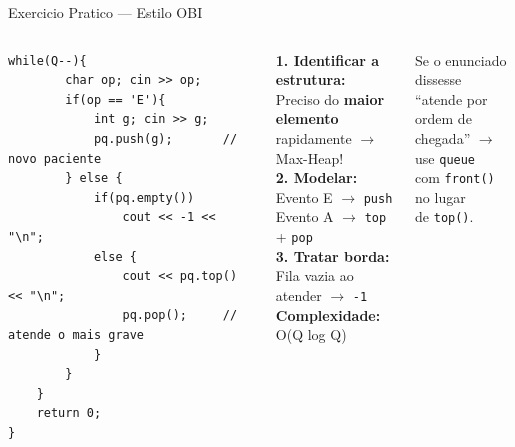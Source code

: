 \documentclass[aspectratio=169,11pt]{beamer}
\begin{document}
\begin{frame}[fragile,shrink=5]{Exercicio Pratico --- Estilo OBI}
\begin{columns}[t]
\begin{tcolorbox}[caixaCodigo]
\begin{lstlisting}[style=cppsmall]
    while(Q--){
        char op; cin >> op;
        if(op == 'E'){
            int g; cin >> g;
            pq.push(g);       // novo paciente
        } else {
            if(pq.empty())
                cout << -1 << "\n";
            else {
                cout << pq.top() << "\n";
                pq.pop();     // atende o mais grave
            }
        }
    }
    return 0;
}
        \end{lstlisting}
      \end{tcolorbox}
      \begin{tcolorbox}[caixaAmarelo,title={Estrategia de solucao}]
        \footnotesize
        \textbf{1. Identificar a estrutura:}\\
        Preciso do \textbf{maior elemento}\\
        rapidamente $\to$ Max-Heap!\\[5pt]
        \textbf{2. Modelar:}\\
        Evento E $\to$ \texttt{push}\\
        Evento A $\to$ \texttt{top} + \texttt{pop}\\[5pt]
        \textbf{3. Tratar borda:}\\
        Fila vazia ao atender $\to$ \texttt{-1}\\[5pt]
        \textbf{Complexidade:}\\
        O(Q log Q)
      \end{tcolorbox}
      \vspace{0.15cm}
      \begin{tcolorbox}[caixaVerde,title={Variacao: fila normal}]
        \footnotesize
        Se o enunciado dissesse\\
        ``atende por ordem de\\
        chegada'' $\to$ use \texttt{queue}\\
        com \texttt{front()} no lugar\\
        de \texttt{top()}.
      \end{tcolorbox}
  \end{columns}
\end{frame}
\end{document}
